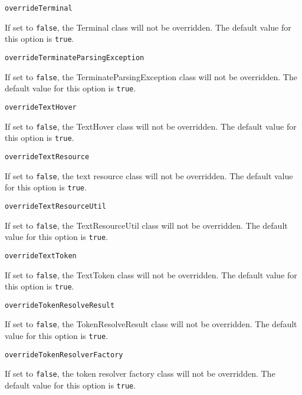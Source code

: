 \noindent\texttt{overrideTerminal}
\begin{myindentpar}{1cm}
If set to \texttt{false}, the Terminal class will not be overridden. The default value for this option is \texttt{true}.
\end{myindentpar}

\noindent\texttt{overrideTerminateParsingException}
\begin{myindentpar}{1cm}
If set to \texttt{false}, the TerminateParsingException class will not be overridden. The default value for this option is \texttt{true}.
\end{myindentpar}

\noindent\texttt{overrideTextHover}
\begin{myindentpar}{1cm}
If set to \texttt{false}, the TextHover class will not be overridden. The default value for this option is \texttt{true}.
\end{myindentpar}

\noindent\texttt{overrideTextResource}
\begin{myindentpar}{1cm}
If set to \texttt{false}, the text resource class will not be overridden. The default value for this option is \texttt{true}.
\end{myindentpar}

\noindent\texttt{overrideTextResourceUtil}
\begin{myindentpar}{1cm}
If set to \texttt{false}, the TextResourceUtil class will not be overridden. The default value for this option is \texttt{true}.
\end{myindentpar}

\noindent\texttt{overrideTextToken}
\begin{myindentpar}{1cm}
If set to \texttt{false}, the TextToken class will not be overridden. The default value for this option is \texttt{true}.
\end{myindentpar}

\noindent\texttt{overrideTokenResolveResult}
\begin{myindentpar}{1cm}
If set to \texttt{false}, the TokenResolveResult class will not be overridden. The default value for this option is \texttt{true}.
\end{myindentpar}

\noindent\texttt{overrideTokenResolverFactory}
\begin{myindentpar}{1cm}
If set to \texttt{false}, the token resolver factory class will not be overridden. The default value for this option is \texttt{true}.
\end{myindentpar}

